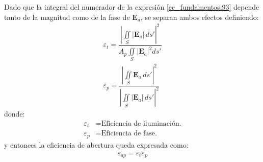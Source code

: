 Dado que la integral del numerador de la expresión \eqref{ec_fundamentos:93} depende tanto de la magnitud como de la fase de $\mathbf{E}_a$, se separan ambos efectos \cite{Orfanidis} definiendo:
\begin{subequations}
\label{grup_ec_fundamentos:10}
\begin{align}
\varepsilon_t  = \dfrac{\left|\displaystyle\iint\limits_S\lvert \mathbf{E}_a\rvert\, ds'\right|^2}{A_p\!\displaystyle\iint\limits_S\lvert \mathbf{E}_a\rvert^2 ds'}
\label{ec_fundamentos:94}\\
\varepsilon_p  = \dfrac{\left|\displaystyle\iint\limits_S\mathbf{E}_a\, ds'\right|^2}{\left|\displaystyle\iint\limits_S\lvert \mathbf{E}_a\rvert\, ds'\right|^2}
\label{ec_fundamentos:95}
\end{align}
\end{subequations}
donde:
\begin{align*}
\varepsilon_t &= \text{Eficiencia de iluminación.}\\
\varepsilon_p &= \text{Eficiencia de fase.}
\end{align*}
y entonces la eficiencia de abertura queda expresada como:
\begin{align}
\varepsilon_{ap}  = \varepsilon_t\varepsilon_p
\label{ec_fundamentos:96}
\end{align}
